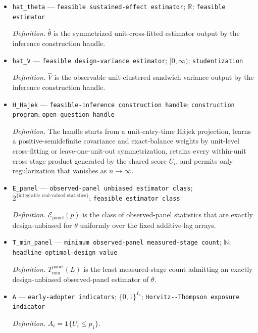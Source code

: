 \documentclass{article}
\begin{document}
\begin{itemize}
  \item \texttt{hat\_\allowbreak{}theta} --- \texttt{feasible sustained-\allowbreak{}effect estimator}; \(\mathbb R\); \texttt{feasible estimator}
  \par\smallskip\noindent\emph{Definition.} \(\widehat\theta\) is the symmetrized unit-cross-fitted estimator output by the inference construction handle.
  \item \texttt{hat\_\allowbreak{}V} --- \texttt{feasible design-\allowbreak{}variance estimator}; \([0,\infty)\); \texttt{studentization}
  \par\smallskip\noindent\emph{Definition.} \(\widehat V\) is the observable unit-clustered sandwich variance output by the inference construction handle.
  \item \texttt{H\_\allowbreak{}Hajek} --- \texttt{feasible-\allowbreak{}inference construction handle}; \texttt{construction program}; \texttt{open-\allowbreak{}question handle}
  \par\smallskip\noindent\emph{Definition.} The handle starts from a unit-entry-time H\'{a}jek projection, learns a positive-semidefinite covariance and exact-balance weights by unit-level cross-fitting or leave-one-unit-out symmetrization, retains every within-unit cross-stage product generated by the shared score \(U_i\), and permits only regularization that vanishes as \(n\to\infty\).
  \item \texttt{E\_\allowbreak{}panel} --- \texttt{observed-\allowbreak{}panel unbiased estimator class}; \(2^{\{\text{integrable real-valued statistics}\}}\); \texttt{feasible estimator class}
  \par\smallskip\noindent\emph{Definition.} \(\mathcal E_{\mathrm{panel}}(p)\) is the class of observed-panel statistics that are exactly design-unbiased for \(\theta\) uniformly over the fixed additive-lag arrays.
  \item \texttt{T\_\allowbreak{}min\_\allowbreak{}panel} --- \texttt{minimum observed-\allowbreak{}panel measured-\allowbreak{}stage count}; \(\mathbb N\); \texttt{headline optimal-\allowbreak{}design value}
  \par\smallskip\noindent\emph{Definition.} \(T_{\min}^{\mathrm{panel}}(L)\) is the least measured-stage count admitting an exactly design-unbiased observed-panel estimator of \(\theta\).
  \item \texttt{A} --- \texttt{early-\allowbreak{}adopter indicators}; \(\{0,1\}^{I_n}\); \texttt{Horvitz-\allowbreak{}-\allowbreak{}Thompson exposure indicator}
  \par\smallskip\noindent\emph{Definition.} \(A_i=\mathbf 1\{U_i\le p_1\}\).

\end{itemize}
\end{document}
